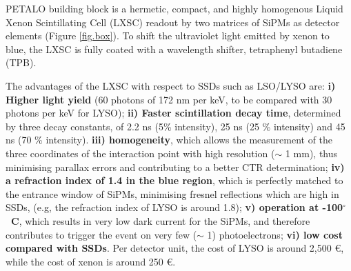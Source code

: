 \documentclass[11pt,a4paper]{article}
\begin{document}
PETALO building block is a hermetic, compact, and highly homogenous Liquid Xenon Scintillating Cell (LXSC) readout by two matrices of SiPMs as detector elements (Figure \ref{fig.box}). To shift the ultraviolet light emitted by xenon to blue, the LXSC is fully coated with a wavelength shifter, tetraphenyl butadiene (TPB).

%
The advantages of the LXSC with respect to SSDs such as LSO/LYSO are: 
%
{\bf i) Higher light yield} (60 photons of 172 nm per keV, to be compared with 30 photons per keV for LYSO);
%
{\bf ii) Faster scintillation decay time}, determined by three decay constants, of 2.2 ns (5\% intensity), 25 ns (25 \% intensity) and 45 ns (70 \% intensity).  
%
 {\bf iii) homogeneity}, which allows the measurement of the three coordinates of the interaction point with high resolution ($\sim$ 1 mm), thus minimising parallax errors and contributing to a better CTR determination;
 {\bf iv) a refraction index of 1.4 in the blue region}, which is perfectly matched to the entrance window of SiPMs, minimising fresnel reflections which are high in SSDs, (e.g, the refraction index of LYSO is around 1.8);
  {\bf v) operation at -100$^\circ$~C}, which results in very low dark current for the SiPMs, and therefore contributes to trigger the event on very few ($\sim$ 1) photoelectrons; 
 {\bf vi) low cost compared with SSDs}. Per detector unit, the cost of LYSO is around 2,500 \euro, while the cost of xenon is around 250 \euro. 
\end{document}
